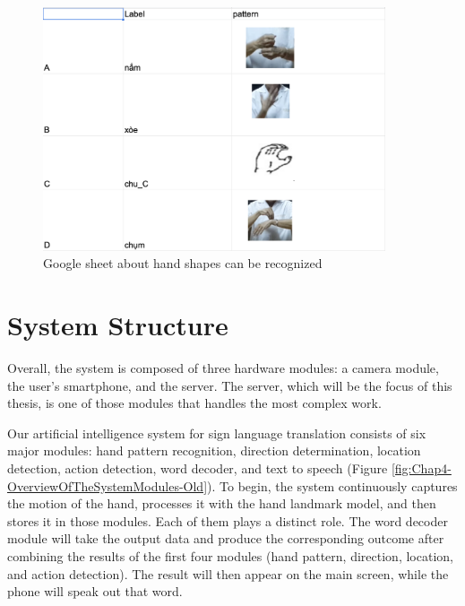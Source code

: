 \begin{figure}[H]
	\centering
	\includegraphics[width=0.9\textwidth]{img/Chap4/Sheet-Pattern.png}
	\caption{Google sheet about hand shapes can be recognized}
	\label{fig:Chap4-Sheet-Pattern}
\end{figure}



\section{System Structure}

Overall, the system is composed of three hardware modules: a camera module, the user's smartphone, and the server. The server, which will be the focus of this thesis, is one of those modules that handles the most complex work.

Our artificial intelligence system for sign language translation consists of six major modules: hand pattern recognition, direction determination, location detection, action detection, word decoder, and text to speech (Figure \ref{fig:Chap4-OverviewOfTheSystemModules-Old}). To begin, the system continuously captures the motion of the hand, processes it with the hand landmark model, and then stores it in those modules. Each of them plays a distinct role. The word decoder module will take the output data and produce the corresponding outcome after combining the results of the first four modules (hand pattern, direction, location, and action detection). The result will then appear on the main screen, while the phone will speak out that word.

